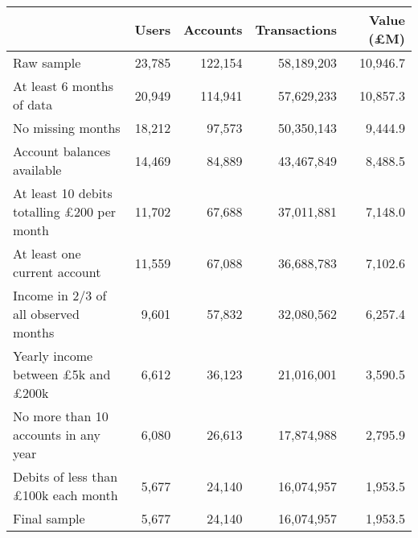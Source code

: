 \begin{tabular}{lrrrr}
\toprule
                                                  &  Users & Accounts & Transactions & Value (\pounds M) \\
\midrule
                                       Raw sample & 23,785 &  122,154 &   58,189,203 &          10,946.7 \\
                        At least 6 months of data & 20,949 &  114,941 &   57,629,233 &          10,857.3 \\
                                No missing months & 18,212 &   97,573 &   50,350,143 &           9,444.9 \\
                       Account balances available & 14,469 &   84,889 &   43,467,849 &           8,488.5 \\
At least 10 debits totalling \pounds200 per month & 11,702 &   67,688 &   37,011,881 &           7,148.0 \\
                     At least one current account & 11,559 &   67,088 &   36,688,783 &           7,102.6 \\
             Income in 2/3 of all observed months &  9,601 &   57,832 &   32,080,562 &           6,257.4 \\
  Yearly income between \pounds5k and \pounds200k &  6,612 &   36,123 &   21,016,001 &           3,590.5 \\
             No more than 10 accounts in any year &  6,080 &   26,613 &   17,874,988 &           2,795.9 \\
       Debits of less than \pounds100k each month &  5,677 &   24,140 &   16,074,957 &           1,953.5 \\
                                     Final sample &  5,677 &   24,140 &   16,074,957 &           1,953.5 \\
\bottomrule
\end{tabular}
